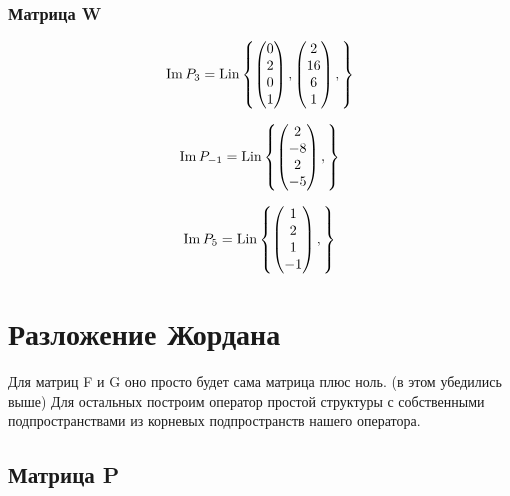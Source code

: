 \documentclass[12pt, a4paper]{article}
\begin{document}
    

    \subsubsection{Матрица W}

    \begin{equation}
        \operatorname{Im} P_{3}  = \operatorname{Lin} \left\{ 
            \begin{pmatrix} 0 \\ 2 \\ 0 \\ 1 \end{pmatrix},
            \begin{pmatrix} 2 \\ 16 \\ 6 \\ 1 \end{pmatrix},
        \right\}
    \end{equation}

    \begin{equation}
        \operatorname{Im} P_{-1}  = \operatorname{Lin} \left\{ 
            \begin{pmatrix} 2 \\ -8 \\ 2 \\ -5 \end{pmatrix},
        \right\}
    \end{equation}

    \begin{equation}
        \operatorname{Im} P_{5}  = \operatorname{Lin} \left\{ 
            \begin{pmatrix} 1 \\ 2 \\ 1 \\ -1 \end{pmatrix},
        \right\}
    \end{equation}


    \section{Разложение Жордана}


    Для матриц F и G оно просто будет сама матрица плюс ноль. (в этом убедились выше)
    Для остальных построим оператор простой структуры с собственными подпространствами 
    из корневых подпространств нашего оператора.


    \subsection{Матрица P}
\end{document}

